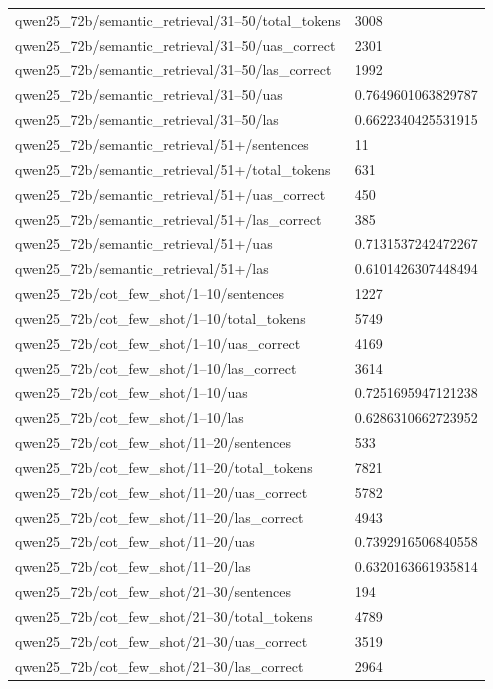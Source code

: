 \begin{tabular}{ll}
qwen25\_72b/semantic\_retrieval/31–50/total\_tokens & 3008 \\
qwen25\_72b/semantic\_retrieval/31–50/uas\_correct & 2301 \\
qwen25\_72b/semantic\_retrieval/31–50/las\_correct & 1992 \\
qwen25\_72b/semantic\_retrieval/31–50/uas & 0.7649601063829787 \\
qwen25\_72b/semantic\_retrieval/31–50/las & 0.6622340425531915 \\
qwen25\_72b/semantic\_retrieval/51+/sentences & 11 \\
qwen25\_72b/semantic\_retrieval/51+/total\_tokens & 631 \\
qwen25\_72b/semantic\_retrieval/51+/uas\_correct & 450 \\
qwen25\_72b/semantic\_retrieval/51+/las\_correct & 385 \\
qwen25\_72b/semantic\_retrieval/51+/uas & 0.7131537242472267 \\
qwen25\_72b/semantic\_retrieval/51+/las & 0.6101426307448494 \\
qwen25\_72b/cot\_few\_shot/1–10/sentences & 1227 \\
qwen25\_72b/cot\_few\_shot/1–10/total\_tokens & 5749 \\
qwen25\_72b/cot\_few\_shot/1–10/uas\_correct & 4169 \\
qwen25\_72b/cot\_few\_shot/1–10/las\_correct & 3614 \\
qwen25\_72b/cot\_few\_shot/1–10/uas & 0.7251695947121238 \\
qwen25\_72b/cot\_few\_shot/1–10/las & 0.6286310662723952 \\
qwen25\_72b/cot\_few\_shot/11–20/sentences & 533 \\
qwen25\_72b/cot\_few\_shot/11–20/total\_tokens & 7821 \\
qwen25\_72b/cot\_few\_shot/11–20/uas\_correct & 5782 \\
qwen25\_72b/cot\_few\_shot/11–20/las\_correct & 4943 \\
qwen25\_72b/cot\_few\_shot/11–20/uas & 0.7392916506840558 \\
qwen25\_72b/cot\_few\_shot/11–20/las & 0.6320163661935814 \\
qwen25\_72b/cot\_few\_shot/21–30/sentences & 194 \\
qwen25\_72b/cot\_few\_shot/21–30/total\_tokens & 4789 \\
qwen25\_72b/cot\_few\_shot/21–30/uas\_correct & 3519 \\
qwen25\_72b/cot\_few\_shot/21–30/las\_correct & 2964 \\

\end{tabular}
